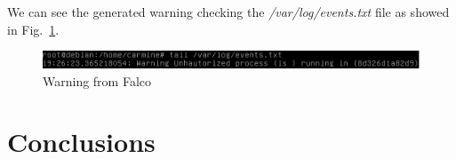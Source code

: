 \documentclass[a4paper,12pt]{article}
\def\myfig#1{Fig.~#1\xspace}
\begin{document}
We can see the generated warning checking the \textit{/var/log/events.txt} file
as showed in \myfig{\ref{fig:falco_warn}}.

\begin{figure}[ht!]
  \centerline{\includegraphics[width=1\textwidth]{falco_warn.png}}
  \caption{Warning from Falco}
  \label{fig:falco_warn}
  \end{figure}

\newpage

\section{Conclusions}
\label{sec:conclusions}
\end{document}
